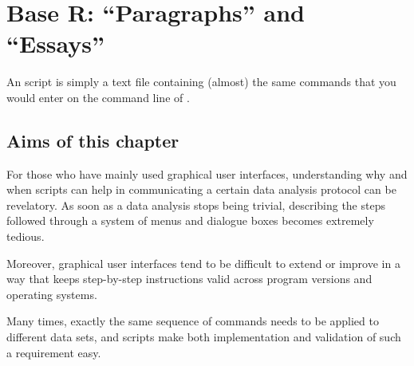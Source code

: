 
\begin{knitrout}
\color{fgcolor}\begin{kframe}


{\ttfamily\noindent{}}

{\ttfamily\noindent\bfseries{}}\end{kframe}
\end{knitrout}

\chapter{Base R: ``Paragraphs'' and ``Essays''}\label{chap:R:scripts}

\begin{VF}
An \Rlang script is simply a text file containing (almost) the same commands that you would enter on the command line of \Rlang.

\nocite{LemonND}
\end{VF}


\section{Aims of this chapter}

For those who have mainly used graphical user interfaces, understanding why and when scripts can help in communicating a certain data analysis protocol can be revelatory. As soon as a data analysis stops being trivial, describing the steps followed through a system of menus and dialogue boxes becomes extremely tedious.

Moreover, graphical user interfaces tend to be difficult to extend or improve in a way that keeps step-by-step instructions valid across program versions and operating systems.

Many times, exactly the same sequence of commands needs to be applied to different data sets, and scripts make both implementation and validation of such a requirement easy.

